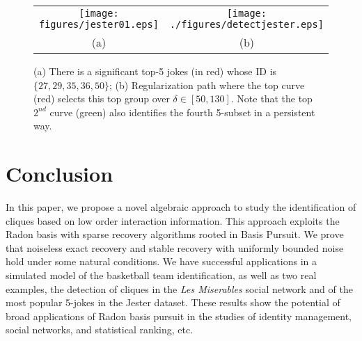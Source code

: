 \documentclass{article}
\begin{document}
\begin{figure}[t]
\begin{center}
\begin{tabular}{cc}
\texttt{[image: figures/jester01.eps]} & \texttt{[image: ./figures/detectjester.eps]} \\
(a) & (b) \\ 
\end{tabular}
\caption{ \label{fig:jester} (a)  There is a significant top-5 jokes (in red) whose ID is $\{27,29,35,36,50\}$; (b) Regularization path where the top curve (red) selects this top group over $\delta\in [50,130]$. Note that the top $2^{nd}$ curve (green) also identifies the fourth 5-subset in a persistent way. }
\end{center}
\end{figure}

\section{Conclusion}
In this paper, we propose a novel algebraic approach to study the identification of cliques based on low order interaction information. This approach exploits the Radon basis with sparse recovery algorithms rooted in 
Basis Pursuit. We prove that noiseless exact recovery and stable recovery with uniformly bounded noise
hold under some natural conditions. We have successful applications in a simulated model of 
the basketball team identification, as well as two real examples, the detection of cliques in 
the {\sl Les Miserables} social network and of the most popular 5-jokes in the Jester dataset. These results show the potential of broad applications of Radon basis pursuit in the studies of identity management, social networks, and statistical ranking, etc. 
\end{document}
